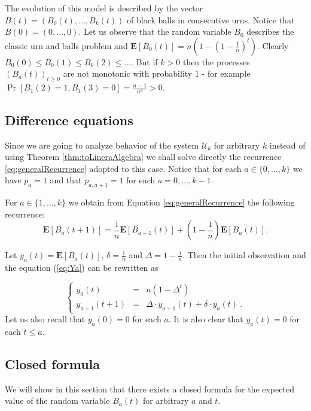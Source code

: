 \documentclass[submission]{dmtcs}
\newcommand{\E}[1]{\mathbf{E}\left[#1\right]}
\begin{document}
The evolution of this model is described by the vector 
$B(t) = (B_0(t),\ldots,B_k(t))$
of black balls in consecutive urns. Notice that $B(0) = (0,\ldots,0)$.
Let us observe that the random variable $B_0$ describes the 
classic urn and balls problem and $\E{B_0(t)} = n\left(1- \left(1-\frac1n\right)^t\right)$.
Clearly $B_0(0)\leq B_0(1) \leq B_0(2)\leq \ldots$. 
But if $k>0$ then the processes $(B_a(t))_{t\geq 0}$ are not monotonic with probability $1$ - 
for example $\Pr[B_1(2)=1, B_1(3)=0] = \frac{n-1}{n^3} > 0$.



\subsection{Difference equations}

Since we are going to analyze behavior of the system $\mathcal{U}_k$
for arbitrary $k$ instead of using Theorem \ref{thm:toLineraAlgebra} 
we shall solve directly the recurrence \ref{eq:generalRecurrence} 
adopted to this case.
Notice that for each $a\in\{0,\ldots,k\}$ we have $p_a=1$ and that 
$p_{a,a+1} = 1$ for each $a=0,\ldots,k-1$. 

For  $a \in \{1,\ldots,k\}$ we obtain from Equation \ref{eq:generalRecurrence}
the following recurrence: 
\begin{equation}
\label{eq:Ya}
    \E{B_{a}(t+1)} = \frac{1}{n} \E{B_{a-1}(t)} +(1-\frac{1}{n}) \E{B_{a}(t)}.
\end{equation}

Let $y_a(t) = \E{B_{a}(t)}$, $\delta=\frac{1}{n}$ and $\Delta = 1 - \frac{1}{n}$. 
Then the initial observation and the equation (\ref{eq:Ya}) can be rewritten as

\begin{equation}
\label{eq:all}
\left\{
\begin{array}{rcl}
y_{0}(t)     &=& n (1 - \Delta^t)\\
y_{a+1}(t+1) &=& \Delta\cdot y_{a+1}(t) + \delta\cdot y_{a}(t)~.
\end{array}
\right.
\end{equation}
%
Let us also recall that $y_{a}(0)=0$ for each $a$.
It is also clear  that $y_{a}(t)=0$ for each $t\leq a$.


\subsection{Closed formula}

We will show in this section that there exists a closed formula for
the expected value of the random variable $B_{a}(t)$ for arbitrary $a$ and $t$.
\end{document}
